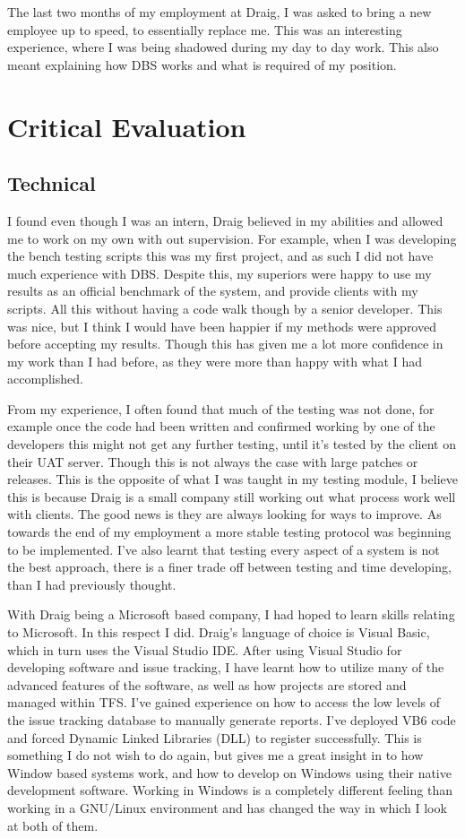 \documentclass[paper=a4, fontsize=11pt]{scrartcl}	%
\begin{document}
The last two months of my employment at Draig, I was asked to bring a new employee up to speed, to essentially replace me. This was an interesting experience, where I was being shadowed during my day to day work. This also meant explaining how DBS works and what is required of my position.

\section{Critical Evaluation}

\subsection{Technical}
I found even though I was an intern, Draig believed in my abilities and allowed me to work on my own with out supervision. For example, when I was developing the bench testing scripts this was my first project, and as such I did not have much experience with DBS. Despite this, my superiors were happy to use my results as an official benchmark of the system, and provide clients with my scripts. All this without having a code walk though by a senior developer. This was nice, but I think I would have been happier if my methods were approved before accepting my results. Though this has given me a lot more confidence in my work than I had before, as they were more than happy with what I had accomplished.

From my experience, I often found that much of the testing was not done, for example once the code had been written and confirmed working by one of the developers this might not get any further testing, until it's tested by the client on their UAT server. Though this is not always the case with large patches or releases. This is the opposite of what I was taught in my testing module, I believe this is because Draig is a small company still working out what process work well with clients. The good news is they are always looking for ways to improve. As towards the end of my employment a more stable testing protocol was beginning to be implemented.  I've also learnt that testing every aspect of a system is not the best approach, there is a finer trade off between testing and time developing, than I had previously thought.

With Draig being a Microsoft based company, I had hoped to learn skills relating to Microsoft. In this respect I did. Draig's language of choice is Visual Basic, which in turn uses the Visual Studio IDE. After using Visual Studio for developing software and issue tracking, I have learnt how to utilize many of the advanced features of the software, as well as how projects are stored and managed within TFS. I've gained experience on how to access the low levels of the issue tracking  database to manually generate reports. I've deployed VB6 code and forced Dynamic Linked Libraries (DLL) to register successfully. This is something I do not wish to do again, but gives me a great insight in to how Window based systems work, and how to develop on Windows using their native development software. Working in Windows is a completely different feeling than working in a GNU/Linux environment and has changed the way in which I look at both of them.
\end{document}
